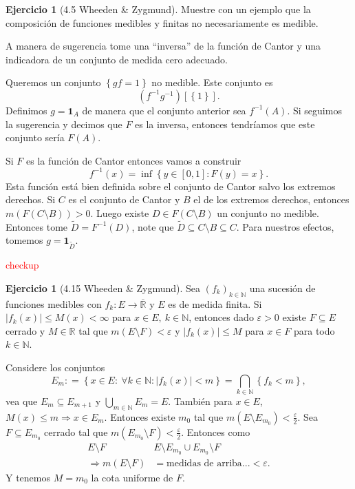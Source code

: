 \documentclass[12pt]{article}
\theoremstyle{plain}
\theoremstyle{definition}
\newtheorem{Ej}[Th]{Ejercicio}
\theoremstyle{remark}
\numberwithin{equation}{section}
\newcommand{\bN}{\mathbb{N}}        %
\newcommand{\bR}{\mathbb{R}}        %
\newcommand{\ind}{\mathbf{1}}       %
\renewcommand{\leq}{\leqslant}      %
\renewcommand{\:}{\colon}           %
\newcommand{\conj}[1]{\left\lbrace#1\right\rbrace}
\newcommand{\bonj}[1]{\left\lbrack#1\right\rbrack}
\begin{document}
\begin{multicols}{2}
\begin{Ej}[4.5  Wheeden \& Zygmund]
Muestre con un ejemplo que la composición de funciones medibles y finitas no necesariamente es medible.
\end{Ej}
A manera de sugerencia tome una ``inversa'' de la función de Cantor y una indicadora de un conjunto de medida cero adecuado.
\begin{ptcbp}
Queremos un conjunto $\conj{gf=1}$ no medible. Este conjunto es
$$(f^{-1}g^{-1})\bonj{\conj{1}}.$$
Definimos $g=\ind_A$ de manera que el conjunto anterior sea $f^{-1}(A)$. Si seguimos la sugerencia y decimos que $F$ es la inversa, entonces tendríamos que este conjunto sería $F(A)$.\par
Si $F$ es la función de Cantor entonces vamos a construir
$$f^{-1}(x)=\inf\conj{y\in\bonj{0,1}\: F(y)=x}.$$
Esta función está bien definida sobre el conjunto de Cantor salvo los extremos derechos. Si $C$ es el conjunto de Cantor y $B$ el de los extremos derechos, entonces $m(F(C\setminus B))>0$. Luego existe $D\in F(C\setminus B)$ un conjunto no medible. Entonces tome $\tilde{D}=F^{-1}(D)$, note que $\tilde{D}\subseteq C\setminus B \subseteq C$. Para nuestros efectos, tomemos $g=\ind_{\tilde{D}}$.
\end{ptcbp}
\textcolor{red}{checkup}

\begin{Ej}[4.15  Wheeden \& Zygmund]
  Sea $(f_k)_{k\in\bN}$ una sucesión de funciones medibles con $f_k\: E\to\overline{\bR}$ y $E$ es de medida finita. Si $|f_k(x)|\leq M(x)<\infty$ para $x\in E,\ k\in\bN$, entonces dado $\varepsilon>0$ existe $F\subseteq E$ cerrado y $M\in\bR$ tal que $m(E\setminus F)<\varepsilon$ y $|f_k(x)|\leq M$ para $x\in F$ para todo $k\in\bN$.
\end{Ej}

\begin{ptcbp}
Considere los conjuntos
$$E_m\:= \conj{x\in E\:\ \forall k\in\bN\: |f_k(x)|<m}=\bigcap_{k\in\bN}\conj{f_k<m},$$
vea que $E_m\subseteq E_{m+1}$ y $\bigcup_{m\in\bN}E_m=E$. También para $x\in E$, $M(x)\leq m\Rightarrow x\in E_m$. Entonces existe $m_0$ tal que $m(E\setminus E_{m_0})<\frac{\varepsilon}{2}$. Sea $F\subseteq E_{m_0}$ cerrado tal que $m(E_{m_0}\setminus F)<\frac{\varepsilon}{2}$. Entonces como
\begin{align*}
  E\setminus F & E\setminus E_{m_0}\cup E_{m_0}\setminus F\\
  \Rightarrow m(E\setminus F)&= \text{medidas de arriba...}<\varepsilon.
\end{align*}
Y tenemos $M=m_0$ la cota uniforme de $F$.
\end{ptcbp}


\end{multicols}
\end{document}

